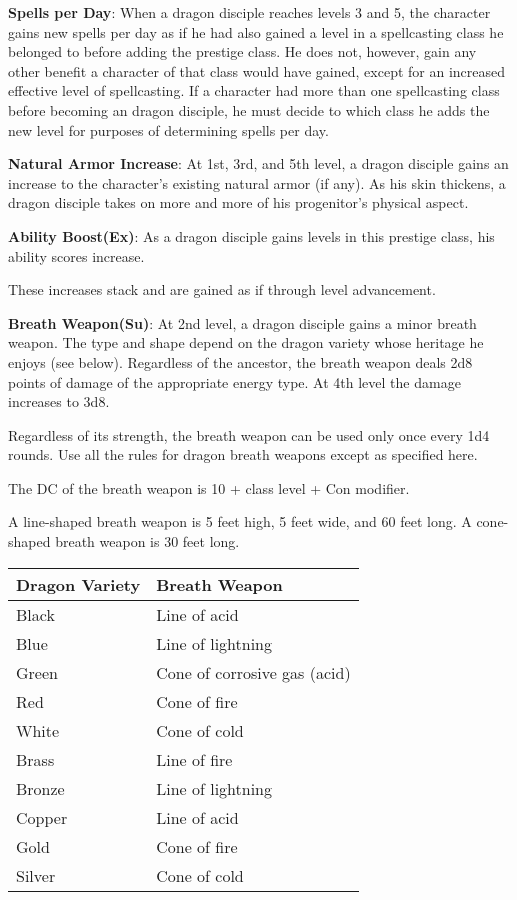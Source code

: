 \textbf{Spells per Day}: When a dragon disciple reaches levels 3 and 5, the character gains new spells per day as if he had also gained a level in a spellcasting class he belonged to before adding the prestige class. He does not, however, gain any other benefit a character of that class would have gained, except for an increased effective level of spellcasting. If a character had more than one spellcasting class before becoming an dragon disciple, he must decide to which class he adds the new level for purposes of determining spells per day.

\textbf{Natural Armor Increase}: At 1st, 3rd, and 5th level, a dragon disciple gains an increase to the character’s existing natural armor (if any). As his skin thickens, a dragon disciple takes on more and more of his progenitor’s physical aspect.

\textbf{Ability Boost(Ex)}: As a dragon disciple gains levels in this prestige class, his ability scores increase.

These increases stack and are gained as if through level advancement.

\textbf{Breath Weapon(Su)}: At 2nd level, a dragon disciple gains a minor breath weapon. The type and shape depend on the dragon variety whose heritage he enjoys (see below). Regardless of the ancestor, the breath weapon deals 2d8 points of damage of the appropriate energy type. At 4th level the damage increases to 3d8.

Regardless of its strength, the breath weapon can be used only once every 1d4 rounds. Use all the rules for dragon breath weapons except as specified here.

The DC of the breath weapon is 10 + class level + Con modifier.

A line-shaped breath weapon is 5 feet high, 5 feet wide, and 60 feet long. A cone-shaped breath weapon is 30 feet long.

\begin{center}
\begin{adjustwidth}{-4cm}{}
\begin{small}
\begin{tabular}{| l | l |}
\hline
Dragon Variety &Breath Weapon \\
\hline
Black &Line of acid \\
Blue &Line of lightning \\
Green &Cone of corrosive gas (acid) \\
Red &Cone of fire \\
White &Cone of cold \\
Brass &Line of fire \\
Bronze &Line of lightning \\
Copper &Line of acid \\
Gold &Cone of fire \\
Silver &Cone of cold \\
\hline
\end{tabular}
\end{small}
\end{adjustwidth}
\end{center}

